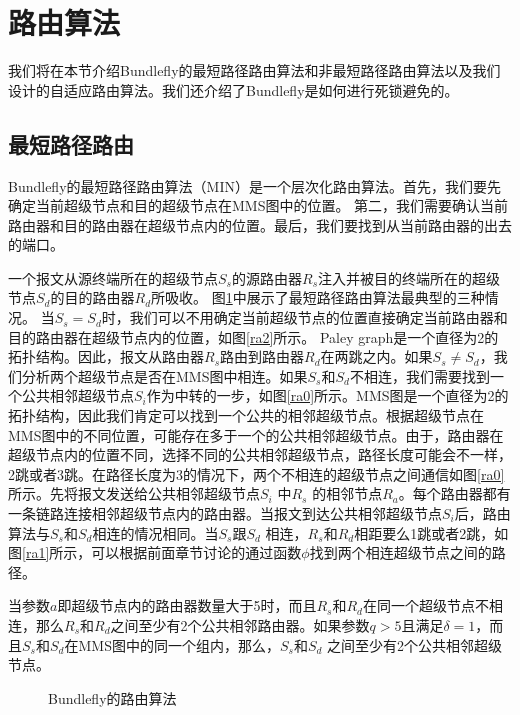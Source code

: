 \section{路由算法}
\label{routingalgorithm}

我们将在本节介绍Bundlefly的最短路径路由算法和非最短路径路由算法以及我们设计的自适应路由算法。我们还介绍了Bundlefly是如何进行死锁避免的。

\subsection{最短路径路由}

Bundlefly的最短路径路由算法（MIN）是一个层次化路由算法。首先，我们要先确定当前超级节点和目的超级节点在MMS图中的位置。
第二，我们需要确认当前路由器和目的路由器在超级节点内的位置。最后，我们要找到从当前路由器的出去的端口。

一个报文从源终端所在的超级节点$S_s$的源路由器$R_s$注入并被目的终端所在的超级节点$S_d$的目的路由器$R_d$所吸收。
图\ref{ra}中展示了最短路径路由算法最典型的三种情况。
当$S_s=S_d$时，我们可以不用确定当前超级节点的位置直接确定当前路由器和目的路由器在超级节点内的位置，如图\ref{ra2}所示。
Paley graph是一个直径为2的拓扑结构。因此，报文从路由器$R_s$路由到路由器$R_d$在两跳之内。如果$S_s \neq S_d$，我们分析两个超级节点是否在MMS图中相连。如果$S_s$和$S_d$不相连，我们需要找到一个公共相邻超级节点$S_i$作为中转的一步，如图\ref{ra0}所示。MMS图是一个直径为2的拓扑结构，因此我们肯定可以找到一个公共的相邻超级节点。根据超级节点在MMS图中的不同位置，可能存在多于一个的公共相邻超级节点。由于，路由器在超级节点内的位置不同，选择不同的公共相邻超级节点，路径长度可能会不一样，2跳或者3跳。在路径长度为3的情况下，两个不相连的超级节点之间通信如图\ref{ra0}所示。先将报文发送给公共相邻超级节点$S_i$ 中$R_s$ 的相邻节点$R_a$。每个路由器都有一条链路连接相邻超级节点内的路由器。当报文到达公共相邻超级节点$S_i$后，路由算法与$S_s$和$S_d$相连的情况相同。当$S_s$跟$S_d$ 相连，$R_s$和$R_d$相距要么1跳或者2跳，如图\ref{ra1}所示，可以根据前面章节讨论的通过函数$\phi$找到两个相连超级节点之间的路径。

当参数$a$即超级节点内的路由器数量大于5时，而且$R_s$和$R_d$在同一个超级节点不相连，那么$R_s$和$R_d$之间至少有2个公共相邻路由器。如果参数$q>5$且满足$\delta=1$，而且$S_s$和$S_d$在MMS图中的同一个组内，那么，$S_s$和$S_d$ 之间至少有2个公共相邻超级节点。



\begin{figure}[t]
\setlength{\belowcaptionskip}{-.5cm}%
\centering
  \vspace{-.3cm}
  \caption{Bundlefly的路由算法}
  \label{ra}
\end{figure}

